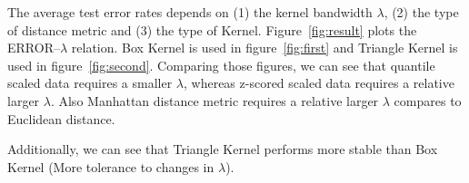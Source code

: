 \documentclass[12pt]{article}
\begin{document}
The average test error rates depends on (1) the kernel bandwidth $\lambda$, (2) the type of distance metric and (3) the type of Kernel. Figure~\ref{fig:result} plots the ERROR--$\lambda$ relation. Box Kernel is used in figure~\ref{fig:first} and Triangle Kernel is used in figure~\ref{fig:second}. Comparing those figures, we can see that quantile scaled data requires a smaller $\lambda$, whereas z-scored scaled data requires a relative larger $\lambda$. Also Manhattan distance metric requires a relative larger $\lambda$ compares to Euclidean distance.

Additionally, we can see that Triangle Kernel performs more stable than Box Kernel (More tolerance to changes in $\lambda$).
\end{document}
